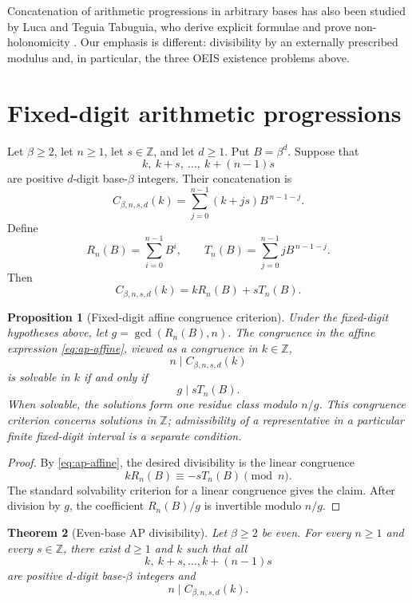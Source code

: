 \documentclass[11pt]{amsart}
\newtheorem{theorem}{Theorem}[section]
\newtheorem{proposition}[theorem]{Proposition}
\theoremstyle{remark}
\begin{document}
Concatenation of arithmetic progressions in arbitrary bases has also been studied by Luca and
Teguia Tabuguia, who derive explicit formulae and prove non-holonomicity
\cite{luca-teguia}.  Our emphasis is different: divisibility by an externally prescribed
modulus and, in particular, the three OEIS existence problems above.

\section{Fixed-digit arithmetic progressions}
\label{sec:fixed-digit-ap}

Let \(\beta\ge2\), let \(n\ge1\), let \(s\in\mathbb Z\), and let \(d\ge1\).  Put
\(B=\beta^d\).  Suppose that
\[
k,\ k+s,\ \ldots,\ k+(n-1)s
\]
are positive \(d\)-digit base-\(\beta\) integers.  Their concatenation is
\begin{equation}\label{eq:ap-concat}
C_{\beta,n,s,d}(k)
  =\sum_{j=0}^{n-1}(k+js)B^{\,n-1-j}.
\end{equation}
Define
\[
R_n(B)=\sum_{i=0}^{n-1}B^i,
\qquad
T_n(B)=\sum_{j=0}^{n-1}jB^{\,n-1-j}.
\]
Then
\begin{equation}\label{eq:ap-affine}
C_{\beta,n,s,d}(k)=kR_n(B)+sT_n(B).
\end{equation}

\begin{proposition}[Fixed-digit affine congruence criterion]\label{prop:fixed-digit-criterion}
Under the fixed-digit hypotheses above, let \(g=\gcd(R_n(B),n)\).  The
congruence in the affine expression \eqref{eq:ap-affine}, viewed as a congruence
in \(k\in\mathbb Z\),
\[
n\mid C_{\beta,n,s,d}(k)
\]
is solvable in \(k\) if and only if
\[
g\mid sT_n(B).
\]
When solvable, the solutions form one residue class modulo \(n/g\).
This congruence criterion concerns solutions in \(\mathbb Z\); admissibility of a
representative in a particular finite fixed-digit interval is a separate condition.
\end{proposition}

\begin{proof}
By \eqref{eq:ap-affine}, the desired divisibility is the linear congruence
\[
kR_n(B)\equiv-sT_n(B)\pmod n.
\]
The standard solvability criterion for a linear congruence gives the claim.  After division
by \(g\), the coefficient \(R_n(B)/g\) is invertible modulo \(n/g\).
\end{proof}

\begin{theorem}[Even-base AP divisibility]\label{thm:even-base-ap}
Let \(\beta\ge2\) be even.  For every \(n\ge1\) and every \(s\in\mathbb Z\), there
exist \(d\ge1\) and \(k\) such that all
\[
k,\ k+s,\ldots,k+(n-1)s
\]
are positive \(d\)-digit base-\(\beta\) integers and
\[
n\mid C_{\beta,n,s,d}(k).
\]
\end{theorem}
\end{document}
